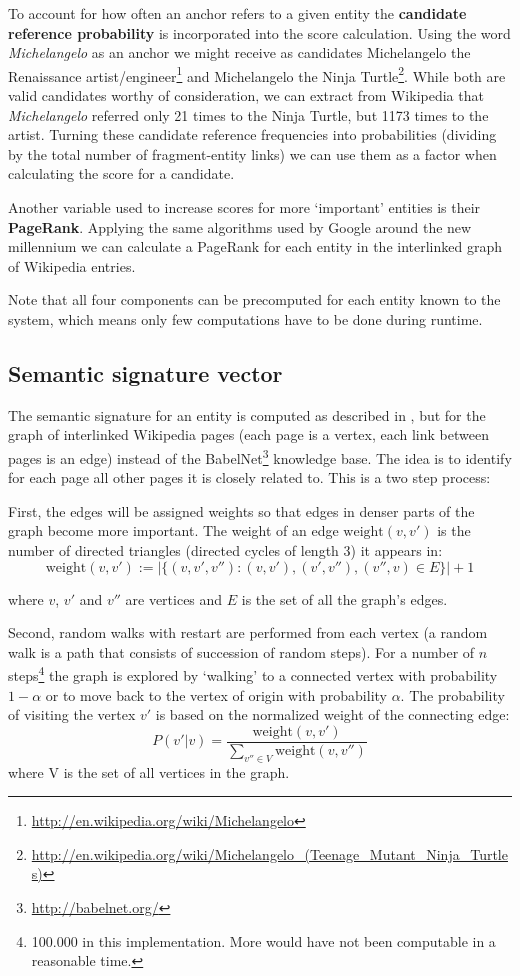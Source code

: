 \documentclass[runningheads,a4paper]{llncs}
\begin{document}
{To account for how often an anchor refers to a given entity the \textbf{candidate reference probability} is incorporated into the score calculation. Using the word \textit{Michelangelo} as an anchor we might receive as candidates Michelangelo the Renaissance artist/engineer\footnote{\url{http://en.wikipedia.org/wiki/Michelangelo}} and Michelangelo the Ninja Turtle\footnote{\url{http://en.wikipedia.org/wiki/Michelangelo_(Teenage_Mutant_Ninja_Turtles)}}. While both are valid candidates worthy of consideration, we can extract from Wikipedia that \textit{Michelangelo} referred only 21 times to the Ninja Turtle, but 1173 times to the artist. Turning these candidate reference frequencies into probabilities (dividing by the total number of fragment-entity links) we can use them as a factor when calculating the score for a candidate.

Another variable used to increase scores for more `important' entities is their \textbf{PageRank}. Applying the same algorithms used by Google around the new millennium we can calculate a PageRank for each entity in the interlinked graph of Wikipedia entries.

Note that all four components can be precomputed for each entity known to the system, which means only few computations have to be done during runtime.


\subsection{Semantic signature vector}\label{subsec:semsig}
The semantic signature for an entity is computed as described in \cite{Babelfy}, but for the graph of interlinked Wikipedia pages (each page is a vertex, each link between pages is an edge) instead of the BabelNet\footnote{\url{http://babelnet.org/}} knowledge base. The idea is to identify for each page all other pages it is closely related to. This is a two step process:

First, the edges will be assigned weights so that edges in denser parts of the graph become more important. The weight of an edge $\mathrm{weight}(v, v')$ is the number of directed triangles (directed cycles of length 3) it appears in:
$$\mathrm{weight}(v, v') := |\{(v, v', v'') : (v, v'), (v', v''), (v'', v) \in E\}| + 1$$

where $v$, $v'$ and $v''$ are vertices and $E$ is the set of all the graph's edges.

Second, random walks with restart are performed from each vertex (a random walk is a path that consists of succession of random steps). For a number of $n$ steps\footnote{100.000 in this implementation. More would have not been computable in a reasonable time.} the graph is explored by `walking' to a connected vertex with probability $1 - \alpha$ or to move back to the vertex of origin with probability $\alpha$. The probability of visiting the vertex $v'$ is based on the normalized weight of the connecting edge:
$$P(v'|v) = \frac{\mathrm{weight}(v, v')}{\sum _{v''\in V} \mathrm{weight}(v, v'')}$$
where V is the set of all vertices in the graph.

}
\end{document}

